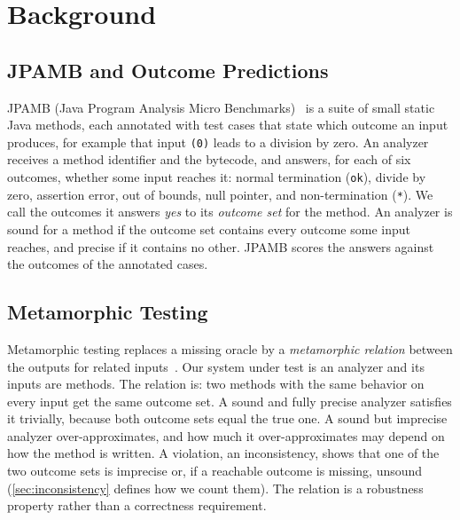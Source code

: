 \section{Background}
\label{sec:background}

\subsection{JPAMB and Outcome Predictions}
\label{sec:jpamb}
JPAMB (Java Program Analysis Micro Benchmarks)~\citep{kalhauge2026jpamb} is a suite
of small static Java methods, each annotated with test cases that state which
outcome an input produces, for example that input \texttt{(0)} leads to a
division by zero. An analyzer receives a method identifier and the bytecode,
and answers, for each of six outcomes, whether some input reaches it: normal
termination (\texttt{ok}), divide by zero, assertion error, out of bounds,
null pointer, and non-termination (\texttt{*}). We call the outcomes it
answers \emph{yes} to its \emph{outcome set} for the method. An analyzer is
sound for a method if the outcome set contains every outcome some input
reaches, and precise if it contains no other. JPAMB scores the answers against
the outcomes of the annotated cases.

\subsection{Metamorphic Testing}
\label{sec:mt}
Metamorphic testing replaces a missing oracle by a \emph{metamorphic
relation} between the outputs for related inputs~\citep{chen2018}. Our system
under test is an analyzer and its inputs are methods. The relation is: two
methods with the same behavior on every input get the same outcome set. A
sound and fully precise analyzer satisfies it trivially, because both outcome
sets equal the true one. A sound but imprecise analyzer over-approximates, and
how much it over-approximates may depend on how the method is written. A
violation, an inconsistency, shows that one of the two outcome sets is
imprecise or, if a reachable outcome is missing, unsound (\cref{sec:inconsistency} defines how we count them). The relation is a
robustness property rather than a correctness requirement.

